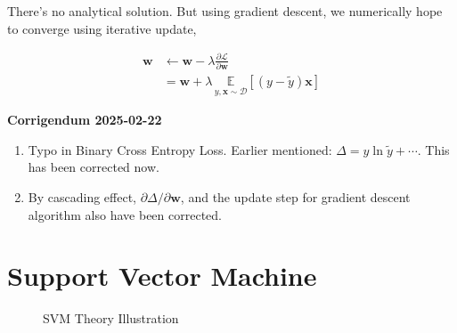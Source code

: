 \documentclass[11pt]{article}
\begin{document}
There’s no analytical solution.  But using gradient
descent, we numerically hope to converge using
iterative update,

\begin{align*}
  \mathbf{w} &\gets \mathbf{w} -\lambda \frac {\partial
               \mathcal{L}} {\partial \mathbf{w}} \\
             &= \mathbf{w} + \lambda \, \underset{y,
               \mathbf{x} \sim \mathcal{D}}
               {\mathbb{E}} \left[(y-\widetilde{y})
               \mathbf{x} \right]
\end{align*}

\textbf{Corrigendum 2025-02-22} \\[0pt]
\begin{enumerate}
\item Typo in Binary Cross Entropy Loss.  Earlier
mentioned: \(\Delta=y\ln\widetilde{y}+\cdots\).  This
has been corrected now.
\item By cascading effect, \(\partial \Delta/\partial
   \mathbf{w}\), and the update step for gradient
descent algorithm also have been corrected.
\end{enumerate}

\section{Support Vector Machine}
\label{sec:org182c5bd}

\begin{figure}[!h]
\LARGE
\centering
\def\svgwidth{0.8\linewidth}

\caption{SVM Theory Illustration}
\end{figure}
\end{document}
